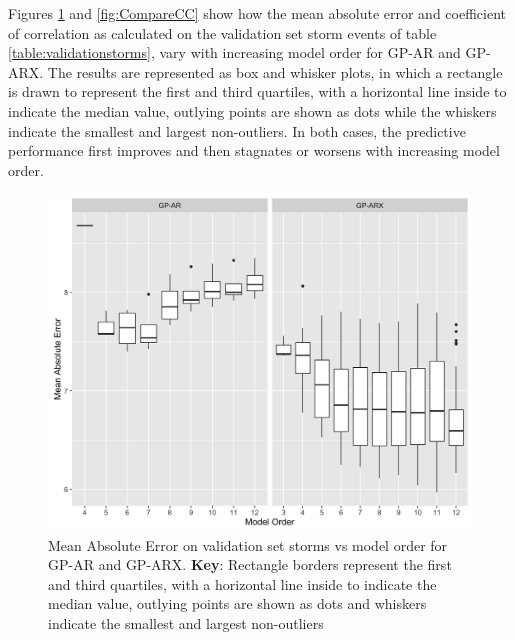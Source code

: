 \documentclass{article}
\begin{document}
Figures \ref{fig:CompareMae} and \ref{fig:CompareCC} show how the mean absolute error and coefficient of correlation as calculated on the validation set storm events of table \ref{table:validationstorms}, vary with increasing model order for GP-AR and GP-ARX. The results are represented as box and whisker plots, in which a rectangle is drawn to represent the first and third quartiles, with a horizontal line inside to indicate the median value, outlying points are shown as dots while the whiskers indicate the smallest and largest non-outliers. In both cases, the predictive performance first improves and then stagnates or worsens with increasing model order. 

\begin{figure}[h]
  \includegraphics[width=\textwidth]{Compare-mae.png}
  \caption{Mean Absolute Error on validation set storms vs model order for GP-AR and GP-ARX. \textbf{Key}: Rectangle borders represent the first and third quartiles, with a horizontal line inside to indicate the median value, outlying points are shown as dots and whiskers indicate the smallest and largest non-outliers}
  \label{fig:CompareMae}
\end{figure}
\end{document}
